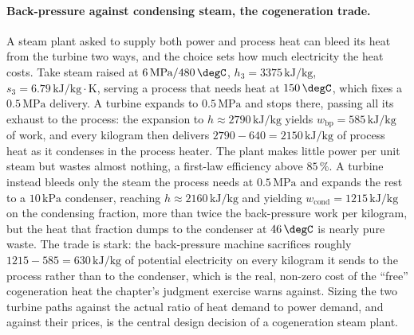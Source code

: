 \paragraph{Back-pressure against condensing steam, the cogeneration trade.} A
steam plant asked to supply both power and process heat can bleed its heat from
the turbine two ways, and the choice sets how much electricity the heat costs.
Take steam raised at $6\,\text{MPa}/480\,\degC$, $h_3 = 3375\,\text{kJ}/\text{kg}$,
$s_3 = 6.79\,\text{kJ}/\text{kg}\cdot\text{K}$, serving a process that needs heat
at $150\,\degC$, which fixes a $0.5\,\text{MPa}$ delivery. A 
turbine expands to $0.5\,\text{MPa}$ and stops there, passing all its exhaust to
the process: the expansion to $h \approx 2790\,\text{kJ}/\text{kg}$ yields
$w_{\text{bp}} = 585\,\text{kJ}/\text{kg}$ of work, and every kilogram then
delivers $2790 - 640 = 2150\,\text{kJ}/\text{kg}$ of process heat as it condenses
in the process heater. The plant makes little power per unit steam but wastes
almost nothing, a first-law efficiency above $85\,\%$. A 
turbine instead bleeds only the steam the process needs at $0.5\,\text{MPa}$ and
expands the rest to a $10\,\text{kPa}$ condenser, reaching $h \approx
2160\,\text{kJ}/\text{kg}$ and yielding $w_{\text{cond}} = 1215\,\text{kJ}/\text{kg}$
on the condensing fraction, more than twice the back-pressure work per kilogram,
but the heat that fraction dumps to the condenser at $46\,\degC$ is nearly pure
waste. The trade is stark: the back-pressure machine sacrifices roughly
$1215 - 585 = 630\,\text{kJ}/\text{kg}$ of potential electricity on every
kilogram it sends to the process rather than to the condenser, which is the real,
non-zero cost of the ``free'' cogeneration heat the chapter's judgment exercise
warns against. Sizing the two turbine paths against the actual ratio of heat
demand to power demand, and against their prices, is the central design decision
of a cogeneration steam plant.

